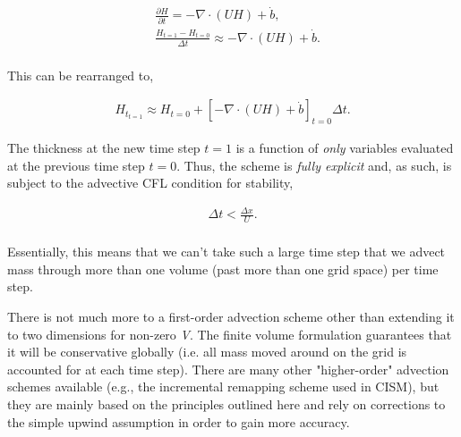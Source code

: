 \begin{align*}
  & \frac{\partial H}{\partial t}=-\nabla \cdot \left( UH \right)+\dot{b}, \\
 & \frac{H_{t=1}-H_{t=0}}{\Delta t}\approx -\nabla \cdot \left( UH \right)+\dot{b}.\\
\end{align*}

This can be rearranged to,

\begin{align*}
H_{t_{t=1}}\approx H_{t=0}+\left[ -\nabla \cdot \left( UH \right)+\dot{b} \right]_{t=0}\Delta t.
\end{align*}

The thickness at the new time step $t=1$ is a function of \textit{only} variables evaluated at the previous time step $t=0$. Thus, the scheme is \textit{fully explicit} and, as such, is subject to the advective CFL condition for stability,

\begin{align*}
\Delta t<\frac{\Delta x}{U}.\\
\end{align*}

Essentially, this means that we can't take such a large time step that we advect mass through more than one volume (past more than one grid space) per time step.

There is not much more to a first-order advection scheme other than extending it to two dimensions for non-zero \textit{V}. The finite volume formulation guarantees that it will be conservative globally (i.e. all mass moved around on the grid is accounted for at each time step). There are many other "higher-order" advection schemes available (e.g., the incremental remapping scheme used in CISM), but they are mainly based on the principles outlined here and rely on corrections to the simple upwind assumption in order to gain more accuracy.

%